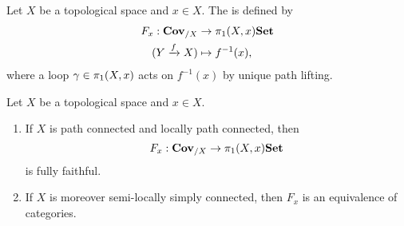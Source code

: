 \begin{defn}
    Let $X$ be a topological space and $x\in X$. The  is defined by
    \begin{align*}
        F_x: \catCoveringSpace_{/X} &\to \homotopy[1](X,x)\catSet\\
        (Y \xrightarrow{f} X) &\mapsto f^{-1}(x),
    \end{align*}
    where a loop $\gamma \in \homotopy[1](X,x)$ acts on $f^{-1}(x)$ by unique path lifting. 
\end{defn}

\begin{thm}[name={\indexterm{monodromy} correspondence}]
    Let $X$ be a topological space and $x \in X$. 
    \begin{enumerate}
        \item If $X$ is path connected and locally path connected, then
        \[
            F_x: \catCoveringSpace_{/X} \to \homotopy[1](X,x)\catSet
        \] is fully faithful. 
        \item If $X$ is moreover semi-locally simply connected, then $F_x$ is an equivalence of categories. 
    \end{enumerate}
\end{thm}
